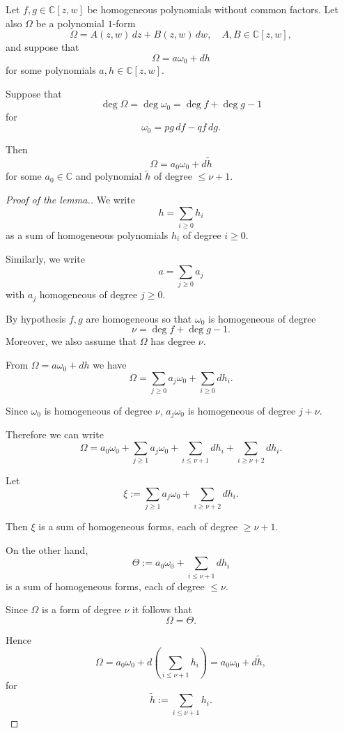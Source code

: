 \documentclass[10pt,a4paper]{amsart}
\begin{document}
\begin{lemma}
\label{lemma:normalformpolynomial}
Let $f,g\in\mathbb{C}[z,w]$ be homogeneous
polynomials without common factors.
Let also $\Omega$ be a polynomial $1$-form
\[
\Omega = A(z,w)\,dz + B(z,w)\,dw,
\quad A,B\in\mathbb{C}[z,w],
\]
and suppose that
\[
\Omega = a \omega_0 + dh
\]
for some polynomials $a,h\in\mathbb{C}[z,w]$.

Suppose that
\[
\deg\Omega=\deg \omega_0=\deg f+\deg g-1
\]
for
\[
\omega_0 = p g\,df - q f\,dg.
\]

Then
\[
\Omega = a_0 \omega_0 + d\tilde h
\]
for some $a_0\in\mathbb{C}$
and polynomial $\tilde h$ of degree $\le \nu+1$.
\end{lemma}

\begin{proof}[Proof of the lemma.]
We write
\[
h=\sum_{i\ge0} h_i
\]
as a sum of homogeneous polynomials $h_i$ of degree $i\ge0$.

Similarly, we write
\[
a=\sum_{j\ge0} a_j
\]
with $a_j$ homogeneous of degree $j\ge0$.

By hypothesis $f,g$ are homogeneous
so that $\omega_0$ is homogeneous of degree
\[
\nu=\deg f+\deg g-1.
\]
Moreover, we also assume that $\Omega$ has degree $\nu$.

From $\Omega=a\omega_0+dh$ we have
\[
\Omega
=
\sum_{j\ge0} a_j \omega_0
+
\sum_{i\ge0} d h_i .
\]

Since $\omega_0$ is homogeneous of degree $\nu$,
$a_j\omega_0$ is homogeneous of degree $j+\nu$.

Therefore we can write
\[
\Omega
=
a_0 \omega_0
+
\sum_{j\ge1} a_j \omega_0
+
\sum_{i\le \nu+1} d h_i
+
\sum_{i\ge \nu+2} d h_i .
\]

Let
\[
\xi
:=
\sum_{j\ge1} a_j \omega_0
+
\sum_{i\ge \nu+2} d h_i .
\]

Then $\xi$ is a sum of homogeneous forms,
each of degree $\ge \nu+1$.

On the other hand,
\[
\Theta
:=
a_0 \omega_0
+
\sum_{i\le \nu+1} d h_i
\]
is a sum of homogeneous forms,
each of degree $\le \nu$.

Since $\Omega$ is a form of degree $\nu$
it follows that
\[
\Omega=\Theta.
\]

Hence
\[
\Omega
=
a_0 \omega_0
+
d\!\left(\sum_{i\le \nu+1} h_i\right)
=
a_0 \omega_0 + d\tilde h,
\]
for
\[
\tilde h := \sum_{i\le \nu+1} h_i.
\]
\end{proof}
\end{document}
